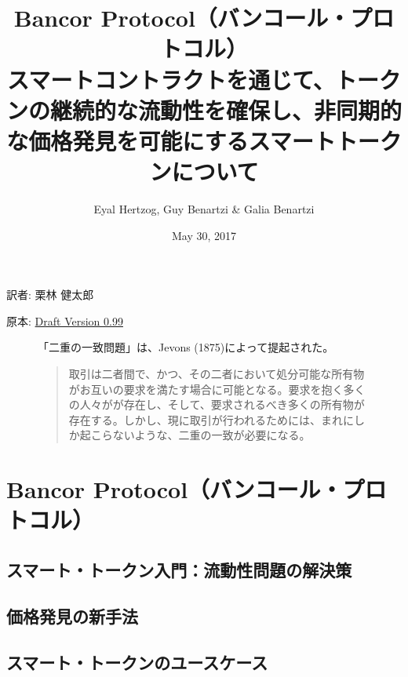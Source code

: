 \documentclass{jsarticle}
\begin{document}
\title{
  Bancor Protocol（バンコール・プロトコル） \\
  \large
  スマートコントラクトを通じて、トークンの継続的な流動性を確保し、非同期的な価格発見を可能にするスマートトークンについて
}

\author{Eyal Hertzog, Guy Benartzi \& Galia Benartzi}
\date{May 30, 2017}

\maketitle

\begin{center}
  \item[訳者:] 栗林 健太郎
  \item[原本:] \href{http://www.hyuki.com/girl/}{Draft Version 0.99}
\end{center}

\begin{figure}[b]
  「二重の一致問題」は、Jevons (1875)によって提起された。

  \begin{quotation}  
    取引は二者間で、かつ、その二者において処分可能な所有物がお互いの要求を満たす場合に可能となる。要求を抱く多くの人々がが存在し、そして、要求されるべき多くの所有物が存在する。しかし、現に取引が行われるためには、まれにしか起こらないような、二重の一致が必要になる。
  \end{quotation}
\end{figure}

\newpage
\tableofcontents
\newpage

\section{Bancor Protocol（バンコール・プロトコル）}



\subsection{スマート・トークン入門：流動性問題の解決策}



\subsection{価格発見の新手法}



\subsection{スマート・トークンのユースケース}
\end{document}
